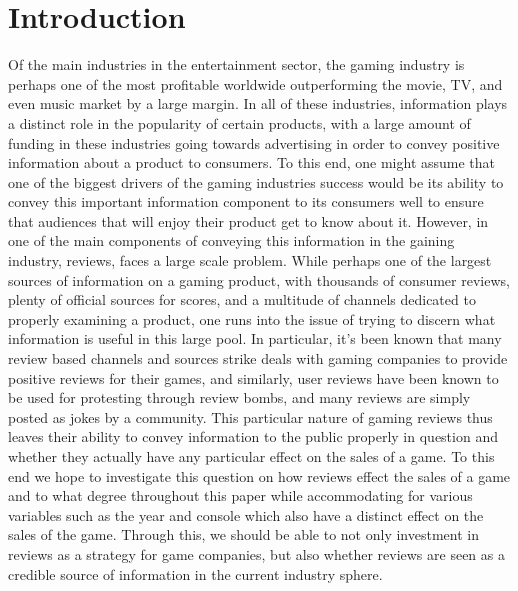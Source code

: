 \documentclass[12pt,english]{article}
\begin{document}
\section{Introduction}\label{sec:intro}
Of the main industries in the entertainment sector, the gaming industry is perhaps one of the most 
profitable worldwide outperforming the movie, TV, and even music market by a large margin. In 
all of these industries, information plays a distinct role in the popularity of certain products, with 
a large amount of funding in these industries going towards advertising in order to convey 
positive information about a product to consumers. To this end, one might assume that one of the 
biggest drivers of the gaming industries success would be its ability to convey this important 
information component to its consumers well to ensure that audiences that will enjoy their 
product get to know about it. However, in one of the main components of conveying this 
information in the gaining industry, reviews, faces a large scale problem. While perhaps one of 
the largest sources of information on a gaming product, with thousands of consumer reviews, 
plenty of official sources for scores, and a multitude of channels dedicated to properly examining 
a product, one runs into the issue of trying to discern what information is useful in this large 
pool. In particular, it’s been known that many review based channels and sources strike deals 
with gaming companies to provide positive reviews for their games, and similarly, user reviews 
have been known to be used for protesting through review bombs, and many reviews are simply 
posted as jokes by a community. This particular nature of gaming reviews thus leaves their 
ability to convey information to the public properly in question and whether they actually have 
any particular effect on the sales of a game. To this end we hope to investigate this question on 
how reviews effect the sales of a game and to what degree throughout this paper while 
accommodating for various variables such as the year and console which also have a distinct 
effect on the sales of the game. Through this, we should be able to not only investment in 
reviews as a strategy for game companies, but also whether reviews are seen as a credible source 
of information in the current industry sphere.
\end{document}
